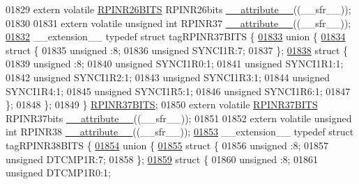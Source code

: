 \begin{DoxyCode}
01829 \textcolor{keyword}{extern} \textcolor{keyword}{volatile} \hyperlink{a00014_d0/d72/a00724}{RPINR26BITS} RPINR26bits \hyperlink{a00015_a493c46f03454991ccc5aa7a6e1dfb2a7}{\_\_attribute\_\_}((\_\_sfr\_\_));
01830 
01831 \textcolor{keyword}{extern} \textcolor{keyword}{volatile} \textcolor{keywordtype}{unsigned} \textcolor{keywordtype}{int}  RPINR37 \hyperlink{a00015_a493c46f03454991ccc5aa7a6e1dfb2a7}{\_\_attribute\_\_}((\_\_sfr\_\_));
\hypertarget{a00015_source_l01832}{}\hyperlink{a00014}{01832} \_\_extension\_\_ \textcolor{keyword}{typedef} \textcolor{keyword}{struct }tagRPINR37BITS \{
\hypertarget{a00015_source_l01833}{}\hyperlink{a00015}{01833}   \textcolor{keyword}{union }\{
\hypertarget{a00015_source_l01834}{}\hyperlink{a00015}{01834}     \textcolor{keyword}{struct }\{
01835       \textcolor{keywordtype}{unsigned} :8;
01836       \textcolor{keywordtype}{unsigned} SYNCI1R:7;
01837     \};
\hypertarget{a00015_source_l01838}{}\hyperlink{a00015}{01838}     \textcolor{keyword}{struct }\{
01839       \textcolor{keywordtype}{unsigned} :8;
01840       \textcolor{keywordtype}{unsigned} SYNCI1R0:1;
01841       \textcolor{keywordtype}{unsigned} SYNCI1R1:1;
01842       \textcolor{keywordtype}{unsigned} SYNCI1R2:1;
01843       \textcolor{keywordtype}{unsigned} SYNCI1R3:1;
01844       \textcolor{keywordtype}{unsigned} SYNCI1R4:1;
01845       \textcolor{keywordtype}{unsigned} SYNCI1R5:1;
01846       \textcolor{keywordtype}{unsigned} SYNCI1R6:1;
01847     \};
01848   \};
01849 \} \hyperlink{a00014_dc/ddc/a00727}{RPINR37BITS};
01850 \textcolor{keyword}{extern} \textcolor{keyword}{volatile} \hyperlink{a00014_dc/ddc/a00727}{RPINR37BITS} RPINR37bits \hyperlink{a00015_a493c46f03454991ccc5aa7a6e1dfb2a7}{\_\_attribute\_\_}((\_\_sfr\_\_));
01851 
01852 \textcolor{keyword}{extern} \textcolor{keyword}{volatile} \textcolor{keywordtype}{unsigned} \textcolor{keywordtype}{int}  RPINR38 \hyperlink{a00015_a493c46f03454991ccc5aa7a6e1dfb2a7}{\_\_attribute\_\_}((\_\_sfr\_\_));
\hypertarget{a00015_source_l01853}{}\hyperlink{a00014}{01853} \_\_extension\_\_ \textcolor{keyword}{typedef} \textcolor{keyword}{struct }tagRPINR38BITS \{
\hypertarget{a00015_source_l01854}{}\hyperlink{a00015}{01854}   \textcolor{keyword}{union }\{
\hypertarget{a00015_source_l01855}{}\hyperlink{a00015}{01855}     \textcolor{keyword}{struct }\{
01856       \textcolor{keywordtype}{unsigned} :8;
01857       \textcolor{keywordtype}{unsigned} DTCMP1R:7;
01858     \};
\hypertarget{a00015_source_l01859}{}\hyperlink{a00015}{01859}     \textcolor{keyword}{struct }\{
01860       \textcolor{keywordtype}{unsigned} :8;
01861       \textcolor{keywordtype}{unsigned} DTCMP1R0:1;

\end{DoxyCode}
